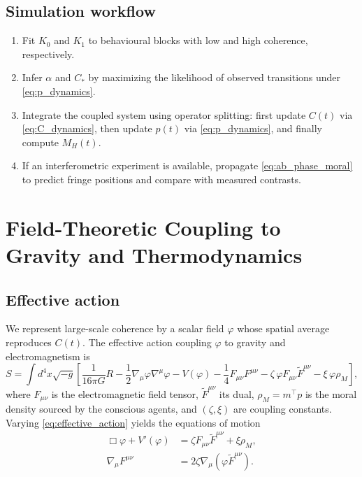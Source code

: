 \documentclass[12pt,a4paper]{article}
\theoremstyle{definition}
\begin{document}
\subsection{Simulation workflow}

\begin{enumerate}
    \item Fit $K_0$ and $K_1$ to behavioural blocks with low and high coherence, respectively.
    \item Infer $\alpha$ and $C_\ast$ by maximizing the likelihood of observed transitions under \eqref{eq:p_dynamics}.
    \item Integrate the coupled system using operator splitting: first update $C(t)$ via \eqref{eq:C_dynamics}, then update $p(t)$ via \eqref{eq:p_dynamics}, and finally compute $M_H(t)$.
    \item If an interferometric experiment is available, propagate \eqref{eq:ab_phase_moral} to predict fringe positions and compare with measured contrasts.
\end{enumerate}

\section{Field-Theoretic Coupling to Gravity and Thermodynamics}
\label{sec:field_action}

\subsection{Effective action}

We represent large-scale coherence by a scalar field $\varphi$ whose spatial average reproduces $C(t)$. The effective action coupling $\varphi$ to gravity and electromagnetism is
\begin{equation}
\label{eq:effective_action}
S = \int d^4x \sqrt{-g} \left[\frac{1}{16\pi G} R - \frac{1}{2} \nabla_\mu \varphi \nabla^\mu \varphi - V(\varphi) - \frac{1}{4} F_{\mu\nu} F^{\mu\nu} - \zeta \, \varphi F_{\mu\nu} \tilde{F}^{\mu\nu} - \xi \, \varphi \rho_M \right],
\end{equation}
where $F_{\mu\nu}$ is the electromagnetic field tensor, $\tilde{F}^{\mu\nu}$ its dual, $\rho_M = m^\top p$ is the moral density sourced by the conscious agents, and $(\zeta,\xi)$ are coupling constants. Varying \eqref{eq:effective_action} yields the equations of motion
\begin{align}
\label{eq:phi_eom}
\Box \varphi + V'(\varphi) &= \zeta F_{\mu\nu} \tilde{F}^{\mu\nu} + \xi \rho_M, \\
\nabla_\mu F^{\mu\nu} &= 2 \zeta \nabla_\mu (\varphi \tilde{F}^{\mu\nu}).
\end{align}
\end{document}
